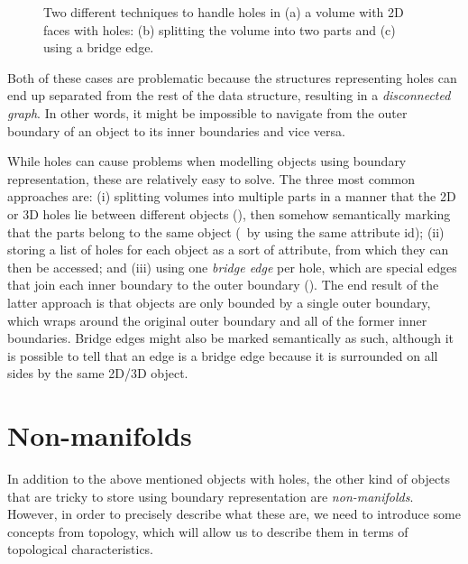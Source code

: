 \begin{figure}
\begin{subfigure}[b]{0.3\linewidth}
\caption{}%
\label{subfig:hole-bridge}
\end{subfigure}
\caption{Two different techniques to handle holes in (a) a volume with 2D faces with holes: (b) splitting the volume into two parts and (c) using a bridge edge.}%
\label{fig:hole}
\end{figure}

Both of these cases are problematic because the structures representing holes can end up separated from the rest of the data structure, resulting in a \emph{disconnected graph}.
In other words, it might be impossible to navigate from the outer boundary of an object to its inner boundaries and vice versa.

While holes can cause problems when modelling objects using boundary representation, these are relatively easy to solve.
The three most common approaches are: (i) splitting volumes into multiple parts in a manner that the 2D or 3D holes lie between different objects (), then somehow semantically marking that the parts belong to the same object (\eg\ by using the same attribute id); (ii) storing a list of holes for each object as a sort of attribute, from which they can then be accessed; and (iii) using one \emph{bridge edge} per hole, which are special edges that join each inner boundary to the outer boundary ().
The end result of the latter approach is that objects are only bounded by a single outer boundary, which wraps around the original outer boundary and all of the former inner boundaries.
Bridge edges might also be marked semantically as such, although it is possible to tell that an edge is a bridge edge because it is surrounded on all sides by the same 2D/3D object.


\section{Non-manifolds}

In addition to the above mentioned objects with holes, the other kind of objects that are tricky to store using boundary representation are \emph{non-manifolds}.
However, in order to precisely describe what these are, we need to introduce some concepts from topology, which will allow us to describe them in terms of topological characteristics.

